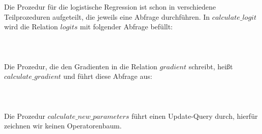 Die Prozedur für die logistische Regression ist schon in verschiedene Teilprozeduren aufgeteilt, die jeweils eine Abfrage durchführen. In $calculate\_logit$ wird die Relation $logits$ mit folgender Abfrage befüllt:
\\\\
\noindent{}
\\\\
Die Prozedur, die den Gradienten in die Relation $gradient$ schreibt, heißt $calculate\_gradient$ und führt diese Abfrage aus:
\\\\
\noindent{}
\\\\
Die Prozedur $calculate\_new\_parameters$ führt einen Update-Query durch, hierfür zeichnen wir keinen Operatorenbaum.

